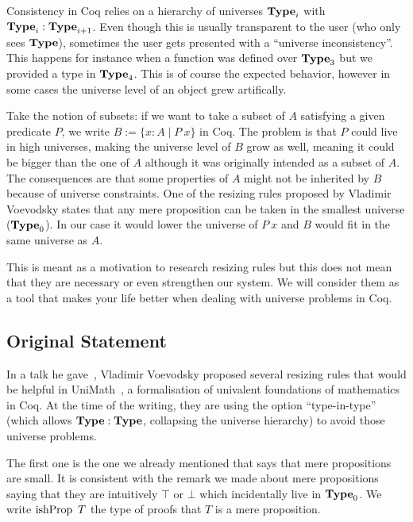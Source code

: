 \documentclass[11pt]{article}
\theoremstyle{plain}
\theoremstyle{remark}
\begin{document}
Consistency in Coq relies on a hierarchy of universes $\operatorname{\mathbf{Type}}_i$ with
$\operatorname{\mathbf{Type}}_i : \operatorname{\mathbf{Type}}_{i+1}$. Even though this is usually transparent to the user
(who only sees $\operatorname{\mathbf{Type}}$), sometimes the user gets presented with a
``universe inconsistency''. This happens for instance when a function was
defined over $\operatorname{\mathbf{Type}}_3$ but we provided a type in $\operatorname{\mathbf{Type}}_4$.
This is of course the expected behavior, however in some cases the universe
level of an object grew artifically.

Take the notion of subsets: if we want to take a subset of $A$ satisfying
a given predicate $P$, we write $B := \{ x : A \mid P\ x \}$ in Coq.
The problem is that $P$ could live in high universes, making the universe level
of $B$ grow as well, meaning it could be bigger than the one of $A$ although
it was originally intended as a subset of $A$.
The consequences are that some properties of $A$ might not be inherited by
$B$ because of universe constraints.
One of the resizing rules proposed by Vladimir Voevodsky states that any
mere proposition can be taken in the smallest universe ($\operatorname{\mathbf{Type}}_0$).
In our case it would lower the universe of $P\ x$ and $B$ would fit in the same
universe as $A$.

This is meant as a motivation to research resizing rules but this does not mean
that they are necessary or even strengthen our system.
We will consider them as a tool that makes your life better when dealing with
universe problems in Coq.

\subsection{Original Statement}

In a talk he gave~\cite{vv:resizing}, Vladimir Voevodsky proposed several
resizing rules that would be helpful in UniMath~\cite{UniMath}, a formalisation
of univalent foundations of mathematics in Coq. At the time of the writing, they
are using the option ``type-in-type'' (which allows $\operatorname{\mathbf{Type}} : \operatorname{\mathbf{Type}}$, collapsing
the universe hierarchy) to avoid those universe problems.

The first one is the one we already mentioned that says that mere propositions
are small. It is consistent with the remark we made about mere propositions
saying that they are intuitively $\top$ or $\bot$ which incidentally live in
$\operatorname{\mathbf{Type}}_0$. We write $\operatorname{ishProp}\ T$ the type of proofs that $T$ is a mere
proposition.

\begin{mathc}
\end{mathc}
\end{document}
